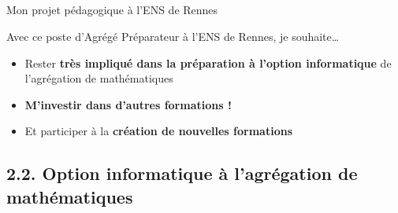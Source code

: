 \documentclass[11pt,english,ignorenonframetext,]{beamer}
\providecommand{\tightlist}{%
  \setlength{\itemsep}{0pt}\setlength{\parskip}{0pt}}
\begin{document}
\subsection{}

\begin{frame}{Mon projet pédagogique à l'ENS de Rennes}

Avec ce poste d'Agrégé Préparateur à l'ENS de Rennes, je souhaite\ldots{}

\pause

\vspace*{20pt}
\begin{itemize}
\tightlist

\item
Rester \textbf{très impliqué dans la préparation à \textcolor{info}{l'option informatique}} de \textcolor{maths}{l'agrégation de mathématiques}
\vspace*{15pt}

\pause
\item
\textbf{M'investir dans d'autres formations !}
\vspace*{15pt}

\item
Et participer à la \textbf{création de nouvelles formations}

\end{itemize}

\end{frame}




\subsection{\hfill{}2.2. Option informatique à l'agrégation de mathématiques\hfill{}}
\end{document}
